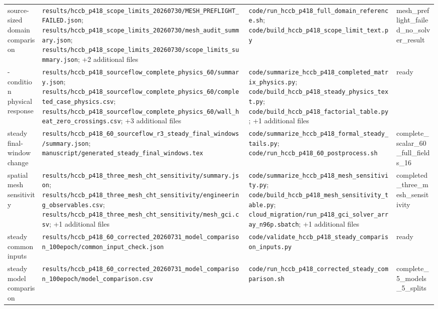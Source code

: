 \begin{longtable}{>{\raggedright\arraybackslash}p{2.8cm}>{\raggedright\arraybackslash}p{6.6cm}>{\raggedright\arraybackslash}p{6.4cm}>{\raggedright\arraybackslash}p{2.4cm}}
source-sized domain comparison & \nolinkurl{results/hccb_p418_scope_limits_20260730/MESH_PREFLIGHT_FAILED.json}; \nolinkurl{results/hccb_p418_scope_limits_20260730/mesh_audit_summary.json}; \nolinkurl{results/hccb_p418_scope_limits_20260730/scope_limits_summary.json}; +2 additional files & \nolinkurl{code/run_hccb_p418_full_domain_reference.sh}; \nolinkurl{code/build_hccb_p418_scope_limit_text.py} & mesh\_\allowbreak{}preflight\_\allowbreak{}failed\_\allowbreak{}no\_\allowbreak{}solver\_\allowbreak{}result \\
60-condition physical response & \nolinkurl{results/hccb_p418_sourceflow_complete_physics_60/summary.json}; \nolinkurl{results/hccb_p418_sourceflow_complete_physics_60/completed_case_physics.csv}; \nolinkurl{results/hccb_p418_sourceflow_complete_physics_60/wall_heat_zero_crossings.csv}; +3 additional files & \nolinkurl{code/summarize_hccb_p418_completed_matrix_physics.py}; \nolinkurl{code/build_hccb_p418_steady_physics_text.py}; \nolinkurl{code/build_hccb_p418_factorial_table.py}; +1 additional files & ready \\
steady final-window change & \nolinkurl{results/hccb_p418_60_sourceflow_r3_steady_final_windows/summary.json}; \nolinkurl{manuscript/generated_steady_final_windows.tex} & \nolinkurl{code/summarize_hccb_p418_formal_steady_tails.py}; \nolinkurl{code/run_hccb_p418_60_postprocess.sh} & complete\_\allowbreak{}scalar\_\allowbreak{}60\_\allowbreak{}full\_\allowbreak{}fields\_\allowbreak{}16 \\
spatial mesh sensitivity & \nolinkurl{results/hccb_p418_three_mesh_cht_sensitivity/summary.json}; \nolinkurl{results/hccb_p418_three_mesh_cht_sensitivity/engineering_observables.csv}; \nolinkurl{results/hccb_p418_three_mesh_cht_sensitivity/mesh_gci.csv}; +1 additional files & \nolinkurl{code/summarize_hccb_p418_mesh_sensitivity.py}; \nolinkurl{code/build_hccb_p418_mesh_sensitivity_table.py}; \nolinkurl{cloud_migration/run_p418_gci_solver_array_n96p.sbatch}; +1 additional files & completed\_\allowbreak{}three\_\allowbreak{}mesh\_\allowbreak{}sensitivity \\
steady common inputs & \nolinkurl{results/hccb_p418_60_corrected_20260731_model_comparison_100epoch/common_input_check.json} & \nolinkurl{code/validate_hccb_p418_steady_comparison_inputs.py} & ready \\
steady model comparison & \nolinkurl{results/hccb_p418_60_corrected_20260731_model_comparison_100epoch/model_comparison.csv} & \nolinkurl{code/run_hccb_p418_corrected_steady_comparison.sh} & complete\_\allowbreak{}5\_\allowbreak{}models\_\allowbreak{}5\_\allowbreak{}splits \\

\end{longtable}
